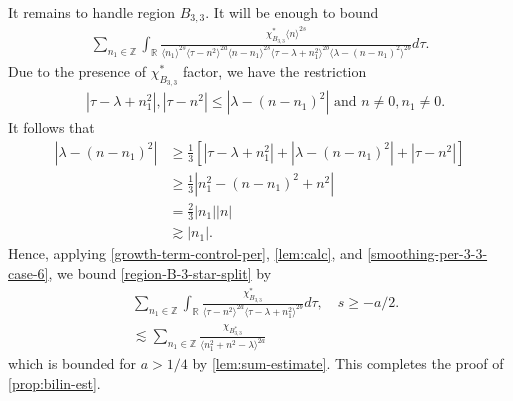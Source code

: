 \documentclass[12pt,reqno]{amsart}
\numberwithin{equation}{section}  %
\numberwithin{figure}{section}
\newcommand{\rr}{\mathbb{R}}
\newcommand{\zz}{\mathbb{Z}}
\theoremstyle{plain}
\theoremstyle{definition}
\theoremstyle{remark}
\begin{document}
%
%
It remains to handle region $B_{3,3}$. It will be enough to bound
%
%
\begin{equation}
  \label{region-B-3-star-split}
\begin{split}
   \sum_{n_{1} \in \zz} \int_{\rr} \frac{\chi^{*}_{B_{3,3}}
    \langle n \rangle ^{2s}
    }{ \langle n_{1} \rangle^{2s} \langle  \tau  - n^{2}
    \rangle ^{2a}  \langle
n-n_{1} \rangle ^{2s}  \langle  \tau - \lambda+n_{1}^{2}
\rangle^{2b} \langle   \lambda  -(n - n_{1})^{2}
\rangle^{2b} } d \tau.
\end{split}
\end{equation}
%
Due to the presence of $\chi^{*}_{B_{3,3}}$ factor, we have the restriction
%
%
\begin{equation*}
\begin{split}
& |\tau - \lambda +n_{1}^2|, | \tau - n^{2} | \le |  \lambda -
(n - n_{1})^{2} | \text{ and }  n \neq 0, n_1 \neq 0.
\end{split}
\end{equation*}
%
It follows that
\begin{equation}
  \label{smoothing-per-3-3-case-6}
\begin{split}
  | \lambda - (n - n_{1})^{2} |
  & \ge \frac{1}{3}\left[ | \tau - \lambda + n_{1}^{2} | + | \lambda - (n - n_{1})^{2}
  | + | \tau - n^{2} | \right]
  \\
  & \ge \frac{1}{3} |  n_{1}^{2} - (n - n_{1})^{2} + n^{2} |
  \\
  & = \frac{2}{3} | n_{1} | | n |
  \\
  & \gtrsim | n_{1} |.
\end{split}
\end{equation}
Hence, applying
\eqref{growth-term-control-per}, \autoref{lem:calc}, and
\eqref{smoothing-per-3-3-case-6}, we bound \eqref{region-B-3-star-split} by
%
%
\begin{equation*}
\begin{split}
   & \sum_{n_{1} \in \zz} \int_{\rr} \frac{\chi^{*}_{B_{3,3}}
    }{ \langle  \tau  - n^{2}
    \rangle ^{2a}   \langle  \tau - \lambda+n_{1}^{2}
\rangle^{2b} } d \tau, \quad s \ge -a/2.
\\
& \lesssim  \sum_{n_{1} \in \zz} \frac{\chi_{B_{3,3}^{*}}}{\langle n_{1}^{2} +
n^{2} - \lambda \rangle^{2a }}
\end{split}
\end{equation*}
which is bounded for $a > 1/4$ by
\autoref{lem:sum-estimate}. This completes the proof of
\autoref{prop:bilin-est}. \qquad \qedsymbol
%
%
\end{document}
